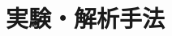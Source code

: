\documentclass[../main.tex]{subfiles}
\begin{document}
\section{実験・解析手法}
\label{sec:methods}
\end{document}
